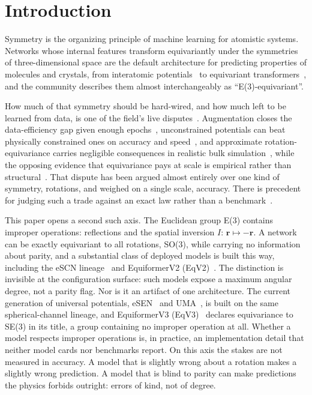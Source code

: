 \section*{Introduction}

Symmetry is the organizing principle of machine learning for atomistic systems. Networks whose internal features transform equivariantly under the symmetries of three-dimensional space are the default architecture for predicting properties of molecules and crystals, from interatomic potentials~\cite{unke2021spookynet,polat2026cliffordip} to equivariant transformers~\cite{fuchs2020se3transformer}, and the community describes them almost interchangeably as ``E(3)-equivariant''.

How much of that symmetry should be hard-wired, and how much left to be learned from data, is one of the field's live disputes~\cite{creed2026six}. Augmentation closes the data-efficiency gap given enough epochs~\cite{brehmer2024scale}, unconstrained potentials can beat physically constrained ones on accuracy and speed~\cite{bigi2026unconstrained}, and approximate rotation-equivariance carries negligible consequences in realistic bulk simulation~\cite{langer2024broken}, while the opposing evidence that equivariance pays at scale is empirical rather than structural~\cite{ngo2025scaling}. That dispute has been argued almost entirely over one kind of symmetry, rotations, and weighed on a single scale, accuracy. There is precedent for judging such a trade against an exact law rather than a benchmark~\cite{bigi2025forces}.

This paper opens a second such axis. The Euclidean group E(3) contains improper operations: reflections and the spatial inversion $I\colon\, \mathbf{r} \mapsto -\mathbf{r}$. A network can be exactly equivariant to all rotations, SO(3), while carrying no information about parity, and a substantial class of deployed models is built this way, including the eSCN lineage~\cite{passaro2023escn} and EquiformerV2 (EqV2)~\cite{liao2024equiformerv2}. The distinction is invisible at the configuration surface: such models expose a maximum angular degree, not a parity flag. Nor is it an artifact of one architecture. The current generation of universal potentials, eSEN~\cite{fu2025esen} and UMA~\cite{wood2025uma}, is built on the same spherical-channel lineage, and EquiformerV3 (EqV3)~\cite{equiformerv3} declares equivariance to SE(3) in its title, a group containing no improper operation at all. Whether a model respects improper operations is, in practice, an implementation detail that neither model cards nor benchmarks report. On this axis the stakes are not measured in accuracy. A model that is slightly wrong about a rotation makes a slightly wrong prediction. A model that is blind to parity can make predictions the physics forbids outright: errors of kind, not of degree.

